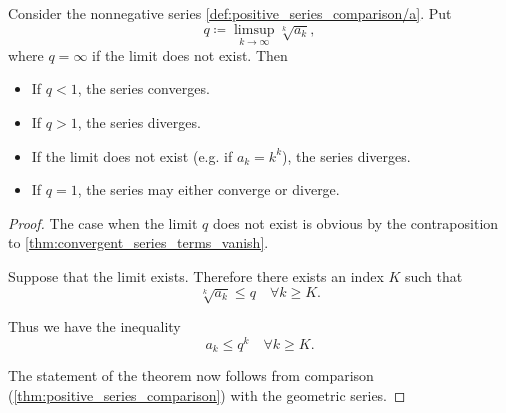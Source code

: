 \begin{proposition}\label{thm:cauchys_root_test}\cite[theorem 3.33]{Rudin1991}
  Consider the nonnegative series \cref{def:positive_series_comparison/a}. Put
  \begin{equation*}
    q \coloneqq \limsup_{k \to \infty} \sqrt[k]{a_k},
  \end{equation*}
  where \( q = \infty \) if the limit does not exist. Then
  \begin{itemize}
    \item If \( q < 1 \), the series converges.
    \item If \( q > 1 \), the series diverges.
    \item If the limit does not exist (e.g. if \( a_k = k^k \)), the series diverges.
    \item If \( q = 1 \), the series may either converge or diverge.
  \end{itemize}
\end{proposition}
\begin{proof}
  The case when the limit \( q \) does not exist is obvious by the contraposition to \cref{thm:convergent_series_terms_vanish}.

  Suppose that the limit exists. Therefore there exists an index \( K \) such that
  \begin{equation*}
    \sqrt[k]{a_k} \leq q \quad\forall k \geq K.
  \end{equation*}

  Thus we have the inequality
  \begin{equation*}
    a_k \leq q^k \quad\forall k \geq K.
  \end{equation*}

  The statement of the theorem now follows from comparison (\cref{thm:positive_series_comparison}) with the geometric series.
\end{proof}


